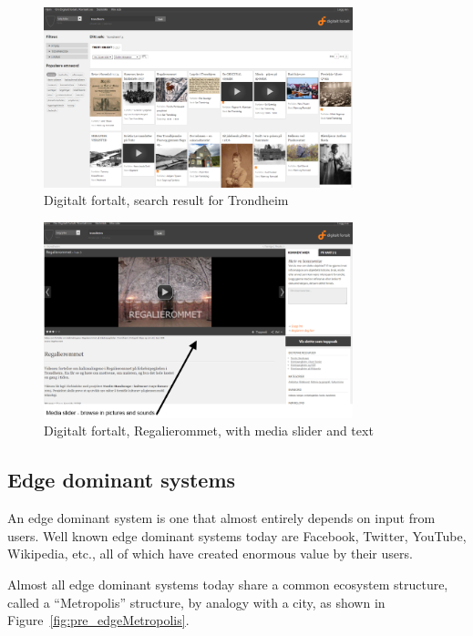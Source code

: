 \documentclass[11pt]{book}
\begin{document}
\begin{figure}[H]
      \centering
      \includegraphics[width=0.8\textwidth]{Figures/Prestudy/digitaltfortaltSokTrondheim.png}
      \caption{ Digitalt fortalt, search result for Trondheim}
      \label{fig:pre_fortaltTrondheim}
\end{figure}

\begin{figure}[H]
      \centering
      \includegraphics[width=0.8\textwidth]{Figures/Prestudy/digitaltfortaltRegalierommet.png}
      \caption{Digitalt fortalt, Regalierommet, with media slider and text}
      \label{fig:pre_fortaltRegalierommet}
\end{figure}

\subsection{Edge dominant systems}
An edge dominant system is one that almost entirely depends on input from users. Well known edge dominant systems today are Facebook, Twitter, YouTube, Wikipedia, etc., all of which have created enormous value by their users. 

Almost all edge dominant systems today share a common ecosystem structure, called a ``Metropolis'' structure, by analogy with a city, as shown in Figure~\ref{fig:pre_edgeMetropolis}.
\end{document}

